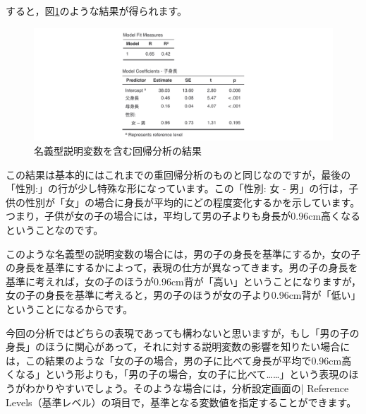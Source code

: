 \documentclass[
  12pt,
  a5jpaper,
  lualatex, ja=standard]{bxjsbook}
\begin{document}
\clearpage

すると，図\ref{fig:regression-lr-reference-results}のような結果が得られます。

\begin{figure}[!ht]

{\centering \includegraphics[width=1\linewidth]{images/regression/lr-reference-results} 

}

\caption{名義型説明変数を含む回帰分析の結果}\label{fig:regression-lr-reference-results}
\end{figure}

この結果は基本的にはこれまでの重回帰分析のものと同じなのですが，最後の「性別:」の行が少し特殊な形になっています。この「性別: 女 - 男」の行は，子供の性別が「女」の場合に身長が平均的にどの程度変化するかを示しています。つまり，子供が女の子の場合には，平均して男の子よりも身長が0.96cm高くなるということなのです。

このような名義型の説明変数の場合には，男の子の身長を基準にするか，女の子の身長を基準にするかによって，表現の仕方が異なってきます。男の子の身長を基準に考えれば，女の子のほうが0.96cm背が「高い」ということになりますが，女の子の身長を基準に考えると，男の子のほうが女の子より0.96cm背が「低い」ということになるからです。

今回の分析ではどちらの表現であっても構わないと思いますが，もし「男の子の身長」のほうに関心があって，それに対する説明変数の影響を知りたい場合には，この結果のような「女の子の場合，男の子に比べて身長が平均で0.96cm高くなる」という形よりも，「男の子の場合，女の子に比べて\ldots\ldots」という表現のほうがわかりやすいでしょう。そのような場合には，分析設定画面の\colorbox{bar}{\textcolor{gmoji2}{| Reference Levels}}（基準レベル）の項目で，基準となる変数値を指定することができます。
\end{document}
